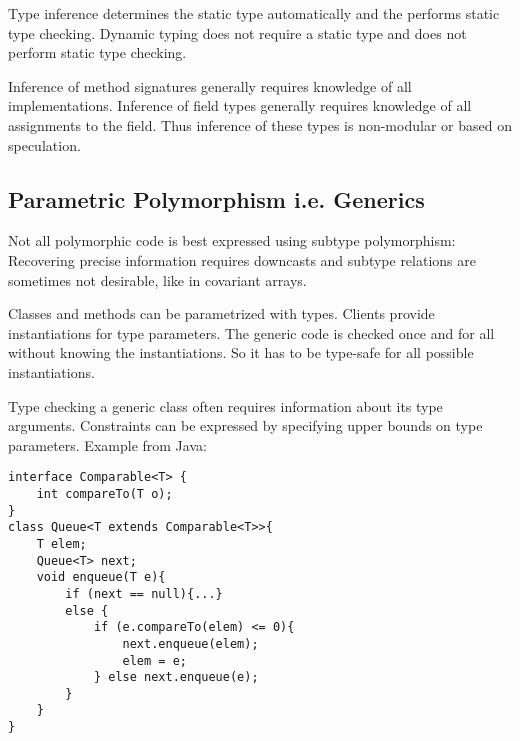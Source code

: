 \begin{mytitle} Type inference determines the static type automatically and the performs static type checking. Dynamic typing does not require a static type and does not perform static type checking.
\end{mytitle}
\begin{mytitle} Inference of method signatures generally requires knowledge of all implementations. Inference of field types generally requires knowledge of all assignments to the field. Thus inference of these types is non-modular or based on speculation. 
\end{mytitle}

\subsection{Parametric Polymorphism i.e. Generics}
\begin{mytitle}[Polymorphism] Not all polymorphic code is best expressed using subtype polymorphism: Recovering precise information requires downcasts and subtype relations are sometimes not desirable, like in covariant arrays.
\end{mytitle}
\begin{mytitle} Classes and methods can be parametrized with types. Clients provide instantiations for type parameters. The generic code is checked once and for all without knowing the instantiations. So it has to be type-safe for all possible instantiations. 
\end{mytitle}
\begin{mytitle} Type checking a generic class often requires information about its type arguments. Constraints can be expressed by specifying upper bounds on type parameters. Example from Java:
\lstset{language = Java}
\begin{lstlisting}
interface Comparable<T> {
    int compareTo(T o);
}
class Queue<T extends Comparable<T>>{
    T elem;
    Queue<T> next;
    void enqueue(T e){
        if (next == null){...}
        else {
            if (e.compareTo(elem) <= 0){
                next.enqueue(elem);
                elem = e;
            } else next.enqueue(e);
        }
    }
}
\end{lstlisting}
\end{mytitle}
